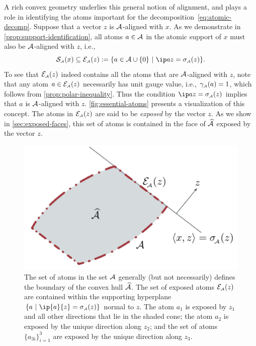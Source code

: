 A rich convex geometry underlies this general notion of alignment, and plays a
role in identifying the atoms important for the decomposition~\eqref{eq:atomic-decomp}.
Suppose that a vector $z$ is $\mathcal{A}$-aligned with $x$. As we demonstrate
in \autoref{prop:support-identification}, all atoms $a\in\mathcal{A}$ in the atomic support 
of $x$ must also be $\mathcal{A}$-aligned with $z$, i.e.,
\begin{equation} \label{eq:exposed-atoms}
  \suppa(x)\subseteq\Escr\As(z):=\{a\in\Ascr\cup\{0\} ~|~ \ip a z = \sigma\As(z) \}.
\end{equation}
To see that $\mathcal{E}_{\scriptscriptstyle\mathcal{A}}(z)$ indeed contains all the atoms that are $\mathcal{A}$-aligned
with $z$, note that any atom $a\in\mathcal{E}_{\scriptscriptstyle\mathcal{A}}(z)$ necessarily has unit gauge value,
i.e., $\gamma_{\scriptscriptstyle\mathcal{A}}(a)=1$, which follows from 
\autoref{prop:polar-inequality}. Thus the condition $\ip a z = \sigma\As(z)$
implies that $a$ is $\mathcal{A}$-aligned with $z$. \autoref{fig:essential-atoms}
presents a visualization of this concept. The atoms in $\mathcal{E}_{\scriptscriptstyle\mathcal{A}}(z)$ are said to
be \emph{exposed} by the vector $z$. As we show in \autoref{sec:exposed-faces},
this set of atoms is contained in the face of $\widehat{\mathcal{A}}$ exposed by the vector
$z$.

\begin{figure}[t]
    \centering
    \includegraphics[page=4]{./figures/illustrations}
    \caption{The set of atoms in the set $\mathcal{A}$ generally (but not necessarily)
      defines the boundary of the convex hull $\widehat{\mathcal{A}}$. The set of exposed atoms
      $\mathcal{E}_{\scriptscriptstyle\mathcal{A}}(z)$ are contained within the supporting hyperplane $\{a~|~\ip{a}{z}
      =\sigma\As(z)\}$ normal to $z$. The atom $a_1$ is exposed by $z_1$ and all
      other directions that lie in the shaded cone; the atom $a_2$ is exposed by
      the unique direction along $z_2$; and the set of atoms
      $\{a_{3i}\}_{i=1}^3$ are exposed by the unique direction along $z_3$. }
    \label{fig:essential-atoms}
 \end{figure}


